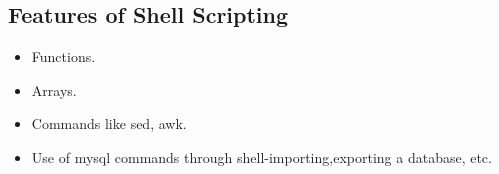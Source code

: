 \subsection{Features of Shell Scripting}
\begin{itemize}
\item Functions.
\item Arrays.
\item Commands like sed, awk.
\item Use of mysql commands through shell-importing,exporting a 
database, etc.
\end{itemize}
